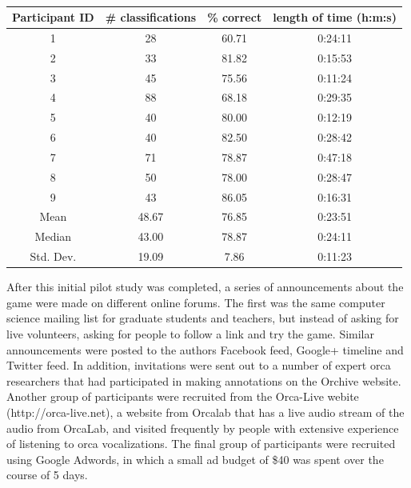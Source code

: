 \documentclass[12pt,oneside]{book}
\begin{document}
\begin{table}
\begin{tabular}{|c|c|c|c|}
\hline
Participant ID & \# classifications & \% correct & length of time (h:m:s) \\
\hline
1              &    28      &       60.71   &       0:24:11 \\                 
2              &    33      &       81.82   &       0:15:53 \\
3              &    45      &       75.56   &       0:11:24 \\
4              &    88      &       68.18   &       0:29:35 \\
5              &    40      &       80.00   &       0:12:19 \\
6              &    40      &       82.50   &       0:28:42 \\
7              &    71      &       78.87   &       0:47:18 \\
8              &    50      &       78.00   &       0:28:47 \\
9              &    43      &       86.05   &       0:16:31 \\
\hline
Mean	       &    48.67	&       76.85	&       0:23:51 \\
Median	       &    43.00	&       78.87	&       0:24:11 \\
Std. Dev.	   &    19.09	&       7.86	&       0:11:23 \\

\end{tabular}
\caption{}
\label{table:handTrimmed}
\end{table}

After this initial pilot study was completed, a series of
announcements about the game were made on different online forums.
The first was the same computer science mailing list for graduate
students and teachers, but instead of asking for live volunteers,
asking for people to follow a link and try the game.  Similar
announcements were posted to the authors Facebook feed, Google+
timeline and Twitter feed.  In addition, invitations were sent out to
a number of expert orca researchers that had participated in making
annotations on the Orchive website.  Another group of participants
were recruited from the Orca-Live webite (http://orca-live.net), a
website from Orcalab that has a live audio stream of the audio from
OrcaLab, and visited frequently by people with extensive experience of
listening to orca vocalizations.  The final group of participants
were recruited using Google Adwords, in which a small ad budget of
\$40 was spent over the course of 5 days.
\end{document}

